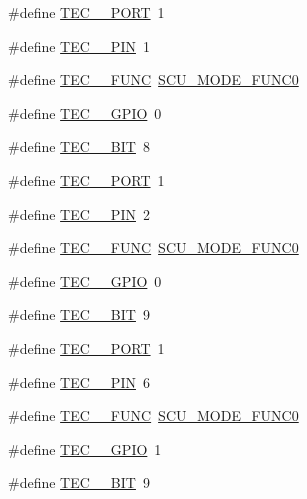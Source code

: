 \begin{DoxyCompactItemize}
\item 
\#define \hyperlink{group__samples_ga6dd94a0728943a6bb0706bae78aa529f}{T\+E\+C\+\_\+\_\+\+P\+O\+RT}~1
\item 
\#define \hyperlink{group__samples_gae23ce57ac09e13a68a782d5bb61c8a30}{T\+E\+C\+\_\+\_\+\+P\+IN}~1
\item 
\#define \hyperlink{group__samples_gae81d46d99322159370646c09d852af70}{T\+E\+C\+\_\+\_\+\+F\+U\+NC}~\hyperlink{group___s_c_u__18_x_x__43_x_x_gaec79b551b98008d8986e719926f254bc}{S\+C\+U\+\_\+\+M\+O\+D\+E\+\_\+\+F\+U\+N\+C0}
\item 
\#define \hyperlink{group__samples_ga83ce1f0ab51ee7b4df55e629cdfc52d9}{T\+E\+C\+\_\+\_\+\+G\+P\+IO}~0
\item 
\#define \hyperlink{group__samples_gaed7549a304721e36693036c8a289ff4c}{T\+E\+C\+\_\+\_\+\+B\+IT}~8
\item 
\#define \hyperlink{group__samples_gac948c6a2caf0ef5cde7fa2c2e94fddb0}{T\+E\+C\+\_\+\_\+\+P\+O\+RT}~1
\item 
\#define \hyperlink{group__samples_gab976c4177676c5c89497cb89480e5dfe}{T\+E\+C\+\_\+\_\+\+P\+IN}~2
\item 
\#define \hyperlink{group__samples_ga0d28555b6255cd5bd89f5618626f044e}{T\+E\+C\+\_\+\_\+\+F\+U\+NC}~\hyperlink{group___s_c_u__18_x_x__43_x_x_gaec79b551b98008d8986e719926f254bc}{S\+C\+U\+\_\+\+M\+O\+D\+E\+\_\+\+F\+U\+N\+C0}
\item 
\#define \hyperlink{group__samples_gae8728c8f2e4279383925ff93a183b407}{T\+E\+C\+\_\+\_\+\+G\+P\+IO}~0
\item 
\#define \hyperlink{group__samples_ga64392cf03fba776f8a9dc238e25ec184}{T\+E\+C\+\_\+\_\+\+B\+IT}~9
\item 
\#define \hyperlink{group__samples_gadd513c832f5c617281c5df0dc67ae80c}{T\+E\+C\+\_\+\_\+\+P\+O\+RT}~1
\item 
\#define \hyperlink{group__samples_ga0b2447cd531de479b88f58f819566522}{T\+E\+C\+\_\+\_\+\+P\+IN}~6
\item 
\#define \hyperlink{group__samples_ga75840b109439b1e90546485e16247097}{T\+E\+C\+\_\+\_\+\+F\+U\+NC}~\hyperlink{group___s_c_u__18_x_x__43_x_x_gaec79b551b98008d8986e719926f254bc}{S\+C\+U\+\_\+\+M\+O\+D\+E\+\_\+\+F\+U\+N\+C0}
\item 
\#define \hyperlink{group__samples_gaa5418f15596d7ada110c4105aa70e561}{T\+E\+C\+\_\+\_\+\+G\+P\+IO}~1
\item 
\#define \hyperlink{group__samples_gac7c8a49f0602d0aeee33923ce8708a4b}{T\+E\+C\+\_\+\_\+\+B\+IT}~9
\end{DoxyCompactItemize}

